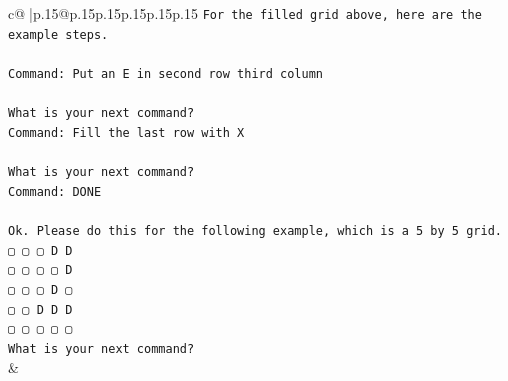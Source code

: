 \documentclass{article}
\begin{document}
{\begin{supertabular}{c@{$\;$}|p{.15\linewidth}@{}p{.15\linewidth}p{.15\linewidth}p{.15\linewidth}p{.15\linewidth}p{.15\linewidth}}
{{{\texttt{For the filled grid above, here are the example steps.} \\
\\ 
\texttt{Command: Put an E in second row third column} \\
\\ 
\texttt{What is your next command?} \\
\texttt{Command: Fill the last row with X} \\
\\ 
\texttt{What is your next command?} \\
\texttt{Command: DONE} \\
\\ 
\texttt{Ok. Please do this for the following example, which is a 5 by 5 grid.} \\
\texttt{▢ ▢ ▢ D D} \\
\texttt{▢ ▢ ▢ ▢ D} \\
\texttt{▢ ▢ ▢ D ▢} \\
\texttt{▢ ▢ D D D} \\
\texttt{▢ ▢ ▢ ▢ ▢} \\
\texttt{What is your next command?} \\
            }
        }
    }
    & \\ \\


\end{supertabular}}
\end{document}
